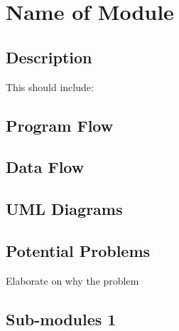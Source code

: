 
\chapter{Name of Module}

\section{Description}

This should include:

\section{Program Flow}


\section{Data Flow}


\section{UML Diagrams}


\section{Potential Problems}

Elaborate on why the problem

\section{Sub-modules 1}

